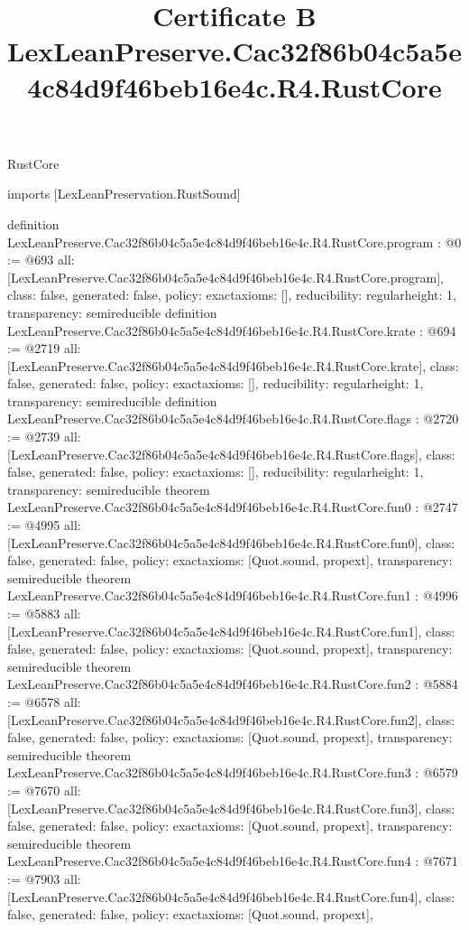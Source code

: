 \begin{lexlean}{RustCore}
\title{Certificate B LexLeanPreserve.Cac32f86b04c5a5e4c84d9f46beb16e4c.R4.RustCore}
\begin{coremodule}
imports [LexLeanPreservation.RustSound]

definition LexLeanPreserve.Cac32f86b04c5a5e4c84d9f46beb16e4c.R4.RustCore.program : @0 := @693 {
  all: [LexLeanPreserve.Cac32f86b04c5a5e4c84d9f46beb16e4c.R4.RustCore.program],
  class: false,
  generated: false,
  policy: exact{axioms: []},
  reducibility: regular{height: 1},
  transparency: semireducible
}
definition LexLeanPreserve.Cac32f86b04c5a5e4c84d9f46beb16e4c.R4.RustCore.krate : @694 := @2719 {
  all: [LexLeanPreserve.Cac32f86b04c5a5e4c84d9f46beb16e4c.R4.RustCore.krate],
  class: false,
  generated: false,
  policy: exact{axioms: []},
  reducibility: regular{height: 1},
  transparency: semireducible
}
definition LexLeanPreserve.Cac32f86b04c5a5e4c84d9f46beb16e4c.R4.RustCore.flags : @2720 := @2739 {
  all: [LexLeanPreserve.Cac32f86b04c5a5e4c84d9f46beb16e4c.R4.RustCore.flags],
  class: false,
  generated: false,
  policy: exact{axioms: []},
  reducibility: regular{height: 1},
  transparency: semireducible
}
theorem LexLeanPreserve.Cac32f86b04c5a5e4c84d9f46beb16e4c.R4.RustCore.fun0 : @2747 := @4995 {
  all: [LexLeanPreserve.Cac32f86b04c5a5e4c84d9f46beb16e4c.R4.RustCore.fun0],
  class: false,
  generated: false,
  policy: exact{axioms: [Quot.sound, propext]},
  transparency: semireducible
}
theorem LexLeanPreserve.Cac32f86b04c5a5e4c84d9f46beb16e4c.R4.RustCore.fun1 : @4996 := @5883 {
  all: [LexLeanPreserve.Cac32f86b04c5a5e4c84d9f46beb16e4c.R4.RustCore.fun1],
  class: false,
  generated: false,
  policy: exact{axioms: [Quot.sound, propext]},
  transparency: semireducible
}
theorem LexLeanPreserve.Cac32f86b04c5a5e4c84d9f46beb16e4c.R4.RustCore.fun2 : @5884 := @6578 {
  all: [LexLeanPreserve.Cac32f86b04c5a5e4c84d9f46beb16e4c.R4.RustCore.fun2],
  class: false,
  generated: false,
  policy: exact{axioms: [Quot.sound, propext]},
  transparency: semireducible
}
theorem LexLeanPreserve.Cac32f86b04c5a5e4c84d9f46beb16e4c.R4.RustCore.fun3 : @6579 := @7670 {
  all: [LexLeanPreserve.Cac32f86b04c5a5e4c84d9f46beb16e4c.R4.RustCore.fun3],
  class: false,
  generated: false,
  policy: exact{axioms: [Quot.sound, propext]},
  transparency: semireducible
}
theorem LexLeanPreserve.Cac32f86b04c5a5e4c84d9f46beb16e4c.R4.RustCore.fun4 : @7671 := @7903 {
  all: [LexLeanPreserve.Cac32f86b04c5a5e4c84d9f46beb16e4c.R4.RustCore.fun4],
  class: false,
  generated: false,
  policy: exact{axioms: [Quot.sound, propext]},
}
\end{coremodule}
\end{lexlean}
